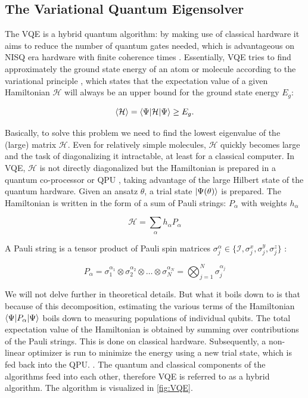 \subsection{The Variational Quantum Eigensolver}

The \ac{VQE} is a hybrid quantum algorithm: by making use of classical hardware it aims to reduce the number of quantum gates needed, which is advantageous on NISQ era hardware with finite coherence times \cite{McClean2016}. 
Essentially, VQE tries to find approximately the ground state energy of an atom or molecule according to the variational principle \cite{Griffiths2004}, which states that the expectation value of a given Hamiltonian $\mathcal{H}$ will always be an upper bound for the ground state energy $E_g$:

\begin{equation}\label{eq:VariationalPrinciple}
	\left\langle \mathcal{H} \right\rangle = \langle\Psi\rvert\mathcal{H} \lvert\Psi\rangle \geq E_g.
\end{equation}

Basically, to solve this problem we need to find the lowest eigenvalue of the (large) matrix $\mathcal{H}$. 
Even for relatively simple molecules, $\mathcal{H}$ quickly becomes large and the task of diagonalizing it intractable, at least for a classical computer.
In \ac{VQE}, $\mathcal{H}$ is not directly diagonalized but the Hamiltonian is prepared in a quantum co-processor or \ac{QPU} \cite{Henriet2020,Peruzzo2014}, taking advantage of the large Hilbert state of the quantum hardware.
Given an ansatz $\theta$, a trial state $\lvert\Psi(\theta)\rangle$ is prepared.
The Hamiltonian is written in the form of a sum of Pauli strings: $P_{\alpha}$ with weights $h_{\alpha}$ \cite{McClean2016,Moll2018}

\begin{equation}
	\mathcal{H} = \sum_{\alpha} h_{\alpha} P_{\alpha}
\end{equation}

A Pauli string is a tensor product of Pauli spin matrices $\sigma_j^{\alpha} \in \{\mathcal{I}, \sigma_j^x, \sigma_j^y, \sigma_j^z\}$ \cite{Griffiths2004}:

\begin{equation}\label{eq:PauliString}
	P_{\alpha} = 
	\sigma_1^{\alpha_1} \otimes \sigma_2^{\alpha_2} \otimes \ldots \otimes \sigma_N^{\alpha_N} = 
	\bigotimes_{j=1}^N \sigma_j^{\alpha_j}
\end{equation}

We will not delve further in theoretical details. 
But what it boils down to is that because of this decomposition, estimating the various terms of the Hamiltonian $\langle\Psi\rvert P_{\alpha} \lvert\Psi\rangle$ boils down to measuring populations of individual qubits.
The total expectation value of the Hamiltonian is obtained by summing over contributions of the Pauli strings.
This is done on classical hardware.
Subsequently, a non-linear optimizer is run to minimize the energy using a new trial state, which is fed back into the \ac{QPU}.
\cite{Moll2018}. 
The quantum and classical components of the algorithms feed into each other, therefore \ac{VQE} is referred to as a hybrid algorithm. 
The algorithm is visualized in \cref{fig:VQE}.

